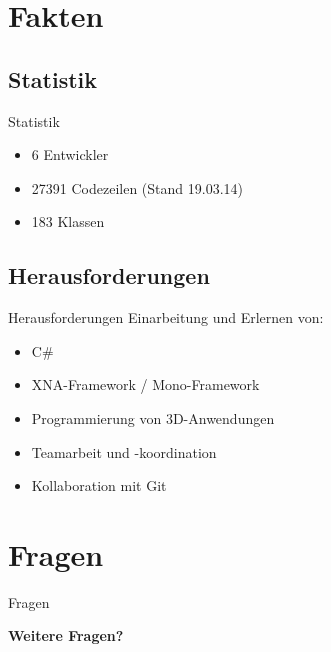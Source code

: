 \documentclass[18pt]{beamer}
\begin{document}
\section{Fakten}
\subsection{Statistik}
\begin{frame}{Statistik}
\begin{itemize}
\item 6 Entwickler
\item 27391 Codezeilen (Stand 19.03.14)
\item 183 Klassen
\end{itemize}
\end{frame}

\subsection{Herausforderungen}
\begin{frame} {Herausforderungen}
Einarbeitung und Erlernen von:
\begin{itemize}
\item C\#
\item XNA-Framework / Mono-Framework
\item Programmierung von 3D-Anwendungen
\item Teamarbeit und -koordination
\item Kollaboration mit Git
\end{itemize}
\end{frame}


\section{Fragen}
\begin{frame}{Fragen}
\begin{center}
\Huge \textbf{Weitere Fragen?}
\end{center}
\end{frame}



%
%
\end{document}

